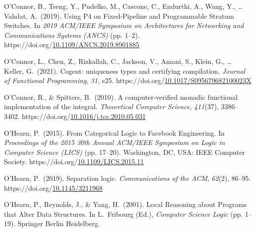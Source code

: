 \documentclass[12pt,twoside]{article}
\begin{document}
{\begin{thebibliography}{1079}
\mdbibitemlabel{}O’Connor, B., Tseng, Y., Pudelko, M., Cascone, C., Endurthi, A., Wang, Y., … Vahdat, A.~(2019). Using P4 on Fixed-Pipeline and Programmable Stratum Switches. In \emph{2019 ACM/IEEE Symposium on Architectures for Networking and Communications Systems (ANCS)} (pp. 1–2). https://doi.org/\href{https://dx.doi.org/10.1109/ANCS.2019.8901885}{10.1109/ANCS.2019.8901885}%

\mdbibitemlabel{}O’Connor, L., Chen, Z., Rizkallah, C., Jackson, V., Amani, S., Klein, G., … Keller, G.~(2021). Cogent: uniqueness types and certifying compilation. \emph{Journal of Functional Programming}, \emph{31}, e25. https://doi.org/\href{https://dx.doi.org/10.1017/S095679682100023X}{10.1017/S095679682100023X}%

\mdbibitemlabel{}O’Connor, R., \& Spitters, B.~(2010). A computer-verified monadic functional implementation of the integral. \emph{Theoretical Computer Science}, \emph{411}(37), 3386–3402. https://doi.org/\href{https://dx.doi.org/10.1016/j.tcs.2010.05.031}{10.1016/j.tcs.2010.05.031}%

\mdbibitemlabel{}O’Hearn, P.~(2015). From Categorical Logic to Facebook Engineering. In \emph{Proceedings of the 2015 30th Annual ACM/IEEE Symposium on Logic in Computer Science (LICS)} (pp. 17–20). Washington, DC, USA: IEEE Computer Society. https://doi.org/\href{https://dx.doi.org/10.1109/LICS.2015.11}{10.1109/LICS.2015.11}%

\mdbibitemlabel{}O’Hearn, P.~(2019). Separation logic. \emph{Communications of the ACM}, \emph{62}(2), 86–95. https://doi.org/\href{https://dx.doi.org/10.1145/3211968}{10.1145/3211968}%

\mdbibitemlabel{}O’Hearn, P., Reynolds, J., \& Yang, H.~(2001). Local Reasoning about Programs that Alter Data Structures. In L.~Fribourg (Ed.), \emph{Computer Science Logic} (pp. 1–19). Springer Berlin Heidelberg.%


\end{thebibliography}}
\end{document}

